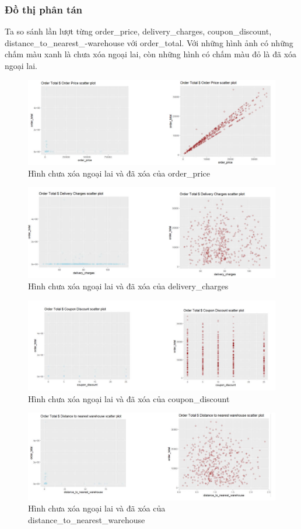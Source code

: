 \subsubsection{Đồ thị phân tán}
Ta so sánh  lần lượt từng order\_price, delivery\_charges, coupon\_discount, distance\_to\_nearest\_-warehouse với order\_total. Với những hình ảnh có những chấm màu xanh là chưa xóa ngoại lai, còn những hình có chấm màu đỏ là đã xóa ngoại lai.
\begin{figure}[!htbp]
    \centering
    \includegraphics[width=0.8\linewidth]{graphics/bang9.jpg}
    \caption{Hình chưa xóa ngoại lai và đã xóa của order\_price}
 
\end{figure}
\begin{figure}[!htbp]
    \centering
    \includegraphics[width=0.8\linewidth]{graphics/bang10.jpg}
    \caption{Hình chưa xóa ngoại lai và đã xóa của delivery\_charges}
    
\end{figure}
\begin{figure}[!htbp]
    \centering
    \includegraphics[width=0.8\linewidth]{graphics/bang11.jpg}
    \caption{Hình chưa xóa ngoại lai và đã xóa của coupon\_discount}
    
\end{figure}
\begin{figure}[!htbp]
    \centering
    \includegraphics[width=0.8\linewidth]{graphics/bang12.jpg}
    \caption{Hình chưa xóa ngoại lai và đã xóa của distance\_to\_nearest\_warehouse}
 
\end{figure}

